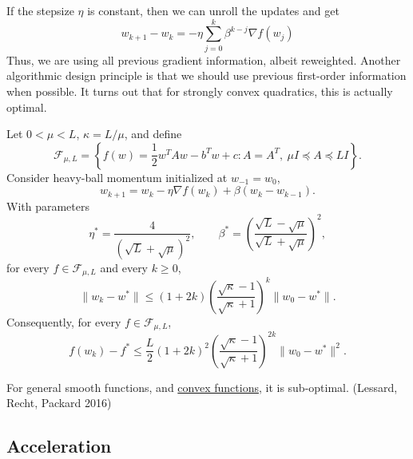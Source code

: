 	If the stepsize $\eta$ is constant, then we can unroll the updates and get 
	\begin{equation}
		w_{k+1} - w_k = - \eta \sum_{j=0}^k \beta^{k-j} \nabla f(w_j)
	\end{equation}
	Thus, we are using all previous gradient information, albeit reweighted. Another algorithmic design principle is that we should use previous first-order information when possible. It turns out that for strongly convex quadratics, this is actually optimal. 

	\begin{theorem}
	  \label{thm:momentum-gd-is-optimal-for-quadratics-cite}
		Let $0 < \mu < L$, $\kappa = L/\mu$, and define
		\begin{equation}
			\mathcal F_{\mu,L} = \left\{ f(w)=\frac12 w^T A w-b^T w+c: A=A^T,\ \mu I\preceq A\preceq LI \right\}.
		\end{equation}
		Consider heavy-ball momentum initialized at $w_{-1}=w_0$,
		\begin{equation}
			w_{k+1} = w_k-\eta\nabla f(w_k) + \beta(w_k-w_{k-1}).
		\end{equation}
		With parameters
		\begin{equation}
			\eta^\ast = \frac{4}{(\sqrt L+\sqrt\mu)^2}, \qquad \beta^\ast = \left( \frac{\sqrt L-\sqrt\mu} {\sqrt L+\sqrt\mu} \right)^2,
		\end{equation}
		for every $f\in\mathcal F_{\mu,L}$ and every $k\geq0$,
		\begin{equation}
			\|w_k-w^\ast\| \leq (1+2k) \left( \frac{\sqrt\kappa-1} {\sqrt\kappa+1} \right)^k \|w_0-w^\ast\|.
		\end{equation}
		Consequently, for every
		$f\in\mathcal F_{\mu,L}$,
		\begin{equation}
			f(w_k)-f^\ast \leq \frac L2(1+2k)^2 \left( \frac{\sqrt\kappa-1} {\sqrt\kappa+1} \right)^{2k} \|w_0-w^\ast\|^2.
		\end{equation}
	\end{theorem}

	\begin{theorem}
	  \label{thm:suboptimality-of-heavy-ball-for-general-smooth}
		For general smooth functions, and \hyperref[mt-def:convex-function]{convex functions}, it is sub-optimal. (Lessard, Recht, Packard 2016) 
	\end{theorem}

\subsection{Acceleration}

